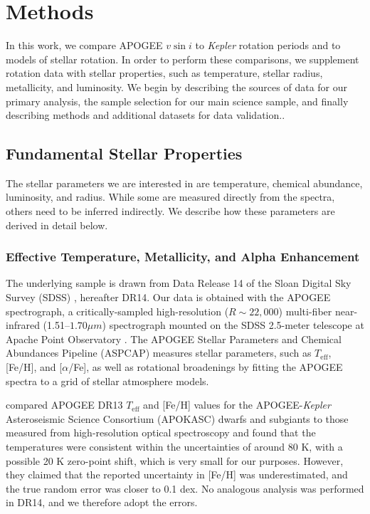 \documentclass[preprint2]{aastex62}
\newcommand{\vsini}{\ensuremath{v \sin i}}
\newcommand{\Kepler}{\mbox{\textit{Kepler}}}
\newcommand{\Teff}{\ensuremath{T_{\textrm{eff}}}}
\newcommand{\feh}{\textrm{[Fe/H]}}
\newcommand{\afe}{\textrm{[\ensuremath{\alpha}/Fe]}}
\begin{document}
\section{Methods}
\label{sec:methods}

In this work, we compare APOGEE \vsini{} to \Kepler{} rotation periods and to models
of stellar rotation.
In order to perform these comparisons, we supplement rotation data with stellar
properties, such as temperature, stellar radius, metallicity, and luminosity.
We begin by describing the sources of data for our primary analysis, the sample selection for our main science sample, and finally describing methods and additional datasets for data validation..

\subsection{Fundamental Stellar Properties}
\label{sec:stelprops}

The stellar parameters we are interested in are temperature, chemical
abundance, luminosity, and radius. While some are measured directly from
the spectra, others need to be inferred indirectly. We describe how these parameters
are derived in detail below.

\subsubsection{Effective Temperature, Metallicity, and Alpha Enhancement}

The underlying sample is drawn from Data Release 14 \citep{Abolfathi18}
of the Sloan Digital Sky Survey (SDSS) \citep{Majewski17}, hereafter DR14. Our
data is obtained with the APOGEE spectrograph, a critically-sampled 
high-resolution (\(R \sim 22,000\)) multi-fiber near-infrared (1.51--\(1.70 \mu m\)) spectrograph 
\citep{Wilson10} mounted on the SDSS 2.5-meter telescope at Apache Point 
Observatory \citep{Gunn06}. The APOGEE Stellar Parameters and Chemical 
Abundances Pipeline (ASPCAP) measures stellar parameters, such as \Teff{}, \feh{}, and \afe{}, as well as rotational
broadenings by fitting the APOGEE spectra to a grid of stellar atmosphere models.

\citet{Serenelli17} compared APOGEE DR13 \Teff{} and \feh{} values 
for the APOGEE-\Kepler{} Asteroseismic Science Consortium (APOKASC) dwarfs and subgiants to 
those measured from high-resolution optical spectroscopy
and found that the temperatures were consistent within the uncertainties of
around 80 K, with a possible 20 K zero-point shift, which is very small for our
purposes. However, they claimed that the reported uncertainty in \feh{} was
underestimated, and the true random error was closer to 0.1 dex. No analogous
analysis was performed in DR14, and we therefore adopt the
\citet{Serenelli17} errors.
\end{document}
